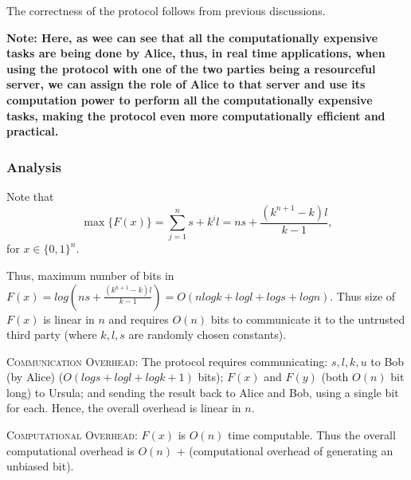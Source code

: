 \documentclass[11pt, letterpaper, romanappendices, onecolumn]{article}
\theoremstyle{plain}\newtheorem{thm}{Theorem}[section]
\theoremstyle{definition}
\theoremstyle{remark}
\begin{document}
The correctness of the protocol follows from previous discussions.

\textbf{Note: Here, as wee can see that all the computationally expensive tasks are being done by Alice, thus, in real time applications, when using the protocol with one of the two parties being a resourceful server, we can assign the role of Alice to that server and use its computation power to perform all the computationally expensive tasks, making the protocol even more computationally efficient and practical.}

\subsubsection{Analysis}
\par Note that
\[
	\max \lbrace F(x) \rbrace = \sum \limits_{j=1}^{n} s+k^i l = ns + \frac{(k^{n+1}-k)l}{k-1},
\]
for $x \in \lbrace 0,1 \rbrace^n$.

\par Thus, maximum number of bits in $F(x) = log(ns + \frac{(k^{n+1}-k)l}{k-1})=O(nlogk + logl + logs + logn)$. Thus size of $F(x)$ is linear in $n$ and requires $O(n)$ bits to communicate it to the untrusted third party (where $k,l,s$ are randomly chosen constants).

\par \textsc{Communication Overhead:} The protocol requires communicating: $s, l, k, u$ to Bob (by Alice) ($O(logs+logl+logk+1)$ bits); $F(x)$ and $F(y)$ (both $O(n)$ bit long) to Ursula; and sending the result back to Alice and Bob, using a single bit for each. Hence, the overall overhead is linear in $n$.

\par \textsc{Computational Overhead:} $F(x)$ is $O(n)$ time computable. Thus the overall computational overhead is $O(n)$ + (computational overhead of generating an unbiased bit).
\end{document}
